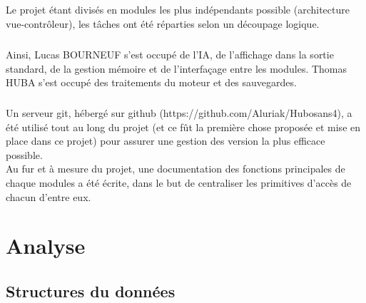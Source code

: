 \documentclass{report}
\begin{document}
    \paragraph*{}
    Le projet étant divisés en modules les plus indépendants possible (architecture vue-contrôleur), les tâches ont été réparties selon un découpage logique.
    \paragraph*{}
    Ainsi, Lucas BOURNEUF s'est occupé de l'IA, de l'affichage dans la sortie standard, de la gestion mémoire et de l'interfaçage entre les modules. 
    Thomas HUBA s'est occupé des traitements du moteur et des sauvegardes.
    \paragraph*{}
    Un serveur git, hébergé sur github (https://github.com/Aluriak/Hubosans4), a été utilisé tout au long du projet (et ce fût la première chose proposée et mise en place dans ce projet) 
    pour assurer une gestion des version la plus efficace possible.\\
    Au fur et à mesure du projet, une documentation des fonctions principales de chaque modules a été écrite, dans le but de centraliser les primitives d'accès de chacun d'entre eux.


\chapter{Analyse}

    \section*{Structures du données}
\end{document}
